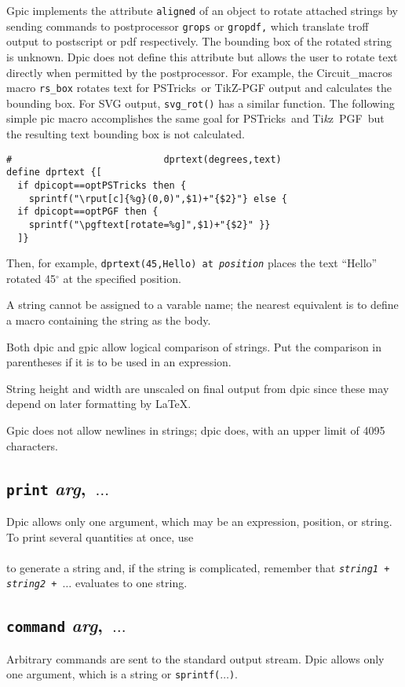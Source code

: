 \documentclass[11pt]{article}
\newcommand{\bq}{}
\newcommand{\PSTricks}{{\bq PSTricks}\xspace}
\newcommand{\TPGF}{{\bq Ti{\it k}z~PGF}\xspace}
\newcommand{\ntt}[1]{\\\hbox{}\quad{\tt #1}}
\begin{document}
  Gpic implements the attribute {\tt aligned} of an object to
  rotate attached strings by sending commands to 
  postprocessor {\tt grops} or {\tt gropdf,}
  which translate troff output to postscript or
  pdf respectively.  The bounding box of the rotated string is unknown.
  Dpic does not define this attribute but allows the user to rotate text
  directly when permitted by the postprocessor.
  For example,
  the Circuit\_macros macro {\tt rs\_box} rotates text for \PSTricks\
  or TikZ-PGF output and calculates the bounding box.
  For SVG output, {\tt svg\_rot()} has a similar function.
  The following simple pic
  macro accomplishes the same goal for \PSTricks\ and \TPGF\ but
  the resulting text bounding box is not calculated.
\begin{verbatim}      
#                           dprtext(degrees,text)
define dprtext {[
  if dpicopt==optPSTricks then {
    sprintf("\rput[c]{%g}(0,0)",$1)+"{$2}"} else {
  if dpicopt==optPGF then {
    sprintf("\pgftext[rotate=%g]",$1)+"{$2}" }}
  ]}
\end{verbatim}      
  Then, for example, {\tt dprtext(45,Hello) at {\sl position}}
  places the text ``Hello'' rotated 45$^{\circ}$ at the specified position.

  A string cannot be assigned to a varable name; the nearest equivalent
  is to define a macro containing the string as the body.

  Both dpic and gpic allow logical comparison of strings.
  Put the comparison in parentheses if it is to be used in an
  expression.

  String height and width are unscaled on final output from dpic since
  these may depend on later formatting by \LaTeX.

  Gpic does not allow newlines in strings; dpic does,
  with an upper limit of 4095 characters.

\subsection{{\tt print} {\sl arg},~$\ldots$}
  Dpic allows only one argument, which may be an expression, position,
  or string.  To print several quantities at once, use
   \ntt{print sprintf($\ldots$)}\\
  to generate a string and, if the string is complicated, remember that
  {\tt {\sl string1} + {\sl string2} +~$\ldots$} evaluates to one string.

\subsection{{\tt command} {\sl arg},~$\ldots$}
  Arbitrary commands are sent to the standard output stream.  Dpic allows only
  one argument, which is a string or {\tt sprintf($\ldots$)}.
\end{document}

